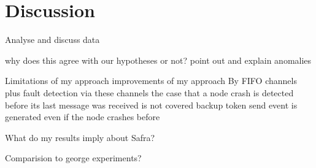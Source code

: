 \section{Discussion}

Analyse and discuss data

why does this agree with our hypotheses or not?
  point out and explain anomalies
  
Limitations of my approach
  improvements of my approach
  By FIFO channels plus fault detection via these channels the case that a node crash is detected before its last message was received is not covered
  backup token send event is generated even if the node crashes before
  
What do my results imply about Safra?
  
Comparision to george experiments?